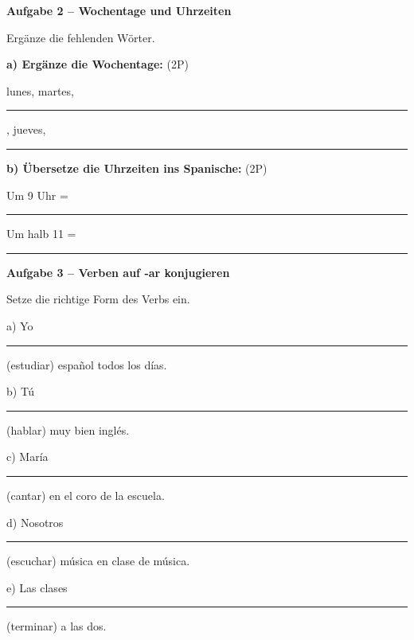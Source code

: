 \documentclass[11pt, a4paper]{article}
\newcommand{\fachfarbe}{spanisch}
\newcommand{\punktebox}[1]{\hfill\fbox{\small \_/#1}}
\newcommand{\luecke}[1]{\rule{#1}{0.4pt}}
\newenvironment{aufgabe}[1]{%
    \needspace{5\baselineskip}%
    \nopagebreak[4]%
    \vspace{10pt}
    \noindent\textbf{\textcolor{\fachfarbe}{Aufgabe #1}}
    \nopagebreak[4]%
    \vspace{5pt}
    \nopagebreak[4]%
    \begin{list}{}{\leftmargin=0pt}
    \item[]
}{%
    \end{list}
}
\begin{document}
\begin{aufgabe}{2 -- Wochentage und Uhrzeiten}
Ergänze die fehlenden Wörter. \punktebox{4}
\end{aufgabe}

\noindent
\textbf{a) Ergänze die Wochentage:} (2P)

\vspace{0.5em}

\noindent
lunes, martes, \luecke{2.5cm}, jueves, \luecke{2.5cm}

\vspace{1em}

\noindent
\textbf{b) Übersetze die Uhrzeiten ins Spanische:} (2P)

\vspace{0.5em}

\noindent
Um 9 Uhr = \luecke{4cm}

\vspace{0.8em}

\noindent
Um halb 11 = \luecke{4cm}

\vspace{15pt}


\begin{aufgabe}{3 -- Verben auf -ar konjugieren}
Setze die richtige Form des Verbs ein. \punktebox{6}
\end{aufgabe}

\noindent
a) Yo \luecke{2.5cm} (estudiar) español todos los días.

\vspace{0.8em}

\noindent
b) Tú \luecke{2.5cm} (hablar) muy bien inglés.

\vspace{0.8em}

\noindent
c) María \luecke{2.5cm} (cantar) en el coro de la escuela.

\vspace{0.8em}

\noindent
d) Nosotros \luecke{2.5cm} (escuchar) música en clase de música.

\vspace{0.8em}

\noindent
e) Las clases \luecke{2.5cm} (terminar) a las dos.

\vspace{0.8em}
\end{document}
